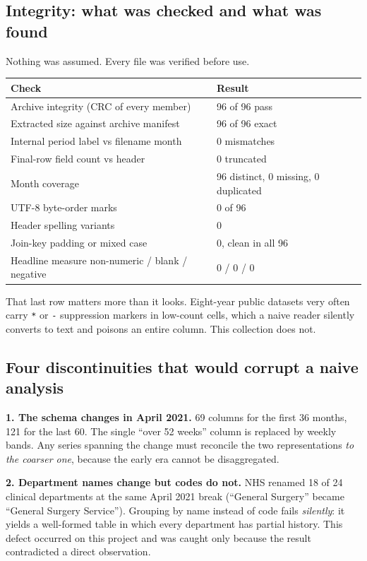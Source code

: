 \documentclass[11pt,a4paper]{article}
\begin{document}
\subsection{Integrity: what was checked and what was found}

Nothing was assumed. Every file was verified before use.

\begin{center}
\begin{tabular}{@{}p{7.4cm}p{7.4cm}@{}}
\toprule
\textbf{Check} & \textbf{Result} \\
\midrule
Archive integrity (CRC of every member) & 96 of 96 pass \\
Extracted size against archive manifest & 96 of 96 exact \\
Internal period label vs filename month & 0 mismatches \\
Final-row field count vs header & 0 truncated \\
Month coverage & 96 distinct, 0 missing, 0 duplicated \\
UTF-8 byte-order marks & 0 of 96 \\
Header spelling variants & 0 \\
Join-key padding or mixed case & 0, clean in all 96 \\
Headline measure non-numeric / blank / negative & 0 / 0 / 0 \\
\bottomrule
\end{tabular}
\end{center}

That last row matters more than it looks. Eight-year public datasets very often carry \texttt{*} or
\texttt{-} suppression markers in low-count cells, which a naive reader silently converts to text and
poisons an entire column. This collection does not.

\subsection{Four discontinuities that would corrupt a naive analysis}

\textbf{1. The schema changes in April 2021.} 69 columns for the first 36 months, 121 for the last 60.
The single ``over 52 weeks'' column is replaced by weekly bands. Any series spanning the change must
reconcile the two representations \emph{to the coarser one}, because the early era cannot be
disaggregated.

\textbf{2. Department names change but codes do not.} NHS renamed 18 of 24 clinical departments at the
same April 2021 break (``General Surgery'' became ``General Surgery Service''). Grouping by name
instead of code fails \emph{silently}: it yields a well-formed table in which every department has
partial history. This defect occurred on this project and was caught only because the result
contradicted a direct observation.
\end{document}
